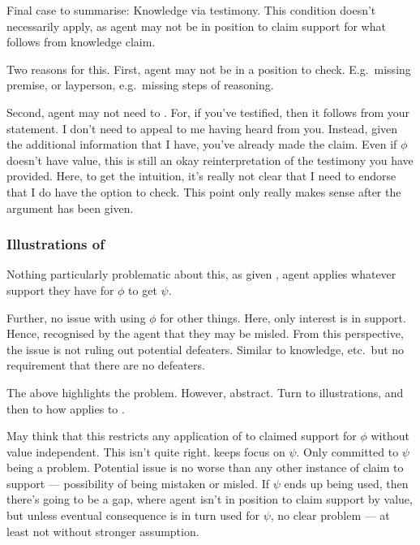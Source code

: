 \begin{note}
  Final case to summarise:
  Knowledge via testimony.
  This condition doesn't necessarily apply, as agent may not be in position to claim support for what follows from knowledge claim.

  Two reasons for this.
  First, agent may not be in a position to check.
  E.g.\ missing premise, or layperson, e.g.\ missing steps of reasoning.

  Second, agent may not need to \RBV{-}.
  For, if you've testified, then it follows from your statement.
  I don't need to appeal to me having heard from you.
  Instead, given the additional information that I have, you've already made the claim.
  Even if \(\phi\) doesn't have value, this is still an okay reinterpretation of the testimony you have provided.
  Here, to get the intuition, it's really not clear that I need to endorse that I do have the option to check.
  {
    \color{red}
    This point only really makes sense after the argument has been given.
  }
\end{note}

\subsubsection{Illustrations of \nI{}}
\label{sec:illustrations-ni}

\begin{note}
  Nothing particularly problematic about this, as given \incl{}, agent applies whatever support they have for \(\phi\) to get \(\psi\).

  Further, no issue with using \(\phi\) for other things.
  Here, only interest is in support.
  Hence, recognised by the agent that they may be misled.
  From this perspective, the issue is not ruling out potential defeaters.
  Similar to knowledge, etc.\ but no requirement that there are no defeaters.
\end{note}

\begin{note}
  The above highlights the problem.
  However, abstract.
  Turn to illustrations, and then to how \nI{} applies to \gsi{}.
\end{note}


\begin{note}
  May think that this restricts any application of \RBV{} to claimed support for \(\phi\) without value independent.
  This isn't quite right.
  \eiS{} keeps focus on \(\psi\).
  Only committed to \(\psi\) being a problem.
  Potential issue is no worse than any other instance of claim to support --- possibility of being mistaken or misled.
  If \(\psi\) ends up being used, then there's going to be a gap, where agent isn't in position to claim support by value, but unless eventual consequence is in turn used for \(\psi\), no clear problem --- at least not without stronger assumption.
\end{note}

